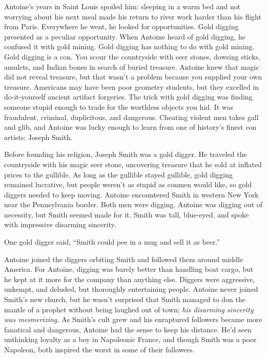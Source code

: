 Antoine's years in Saint Louis spoiled him: sleeping in a warm bed and
not worrying about his next meal made his return to river work harder
than his flight from Paris. Everywhere he went, he looked for
opportunities. Gold digging presented as a peculiar opportunity. When
Antoine heard of gold digging, he confused it with gold mining. Gold
digging has nothing to do with gold mining. Gold digging is a con. You
scour the countryside with seer stones, dowsing sticks, amulets, and
Indian bones in search of buried treasure. Antoine knew that magic did
not reveal treasure, but that wasn't a problem because you supplied your
own treasure. Americans may have been poor geometry students, but they
excelled in do-it-yourself ancient artifact forgeries. The trick with
gold digging was finding someone stupid enough to trade for the
worthless objects you hid. It was fraudulent, criminal, duplicitous, and
dangerous. Cheating violent men takes gall and glib, and Antoine was
lucky enough to learn from one of history's finest con artists: Joseph
Smith.

Before founding his religion, Joseph Smith was a gold digger. He
traveled the countryside with his magic seer stone, uncovering treasure
that he sold at inflated prices to the gullible. As long as the gullible
stayed gullible, gold digging remained lucrative, but people weren't as
stupid as conmen would like, so gold diggers needed to keep moving.
Antoine encountered Smith in western New York near the Pennsylvania
border. Both men were digging. Antoine was digging out of necessity, but
Smith seemed made for it. Smith was tall, blue-eyed, and spoke with
impressive disarming sincerity.

One gold digger said, ``Smith could pee in a mug and sell it as beer.''

Antoine joined the diggers orbiting Smith and followed them around
middle America. For Antoine, digging was barely better than handling
boat cargo, but he kept at it more for the company than anything else.
Diggers were aggressive, unkempt, and deluded, but thoroughly
entertaining people. Antoine never joined Smith's new church, but he
wasn't surprised that Smith managed to don the mantle of a prophet
without being laughed out of town; \emph{his disarming sincerity was
mesmerizing.} As Smith's cult grew and his enraptured followers became
more fanatical and dangerous, Antoine had the sense to keep his
distance. He'd seen unthinking loyalty as a boy in Napoleonic France,
and though Smith was a poor Napoleon, both inspired the worst in some of
their followers.

